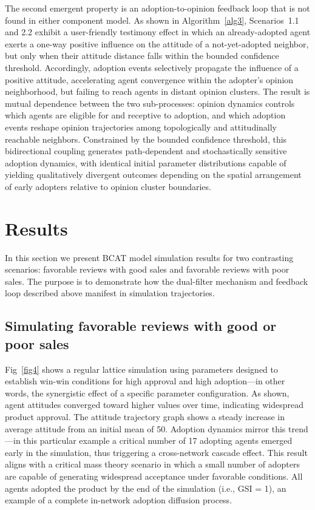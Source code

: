 \documentclass[10pt,letterpaper]{article}
\begin{document}
The second emergent property is an adoption-to-opinion feedback loop that is not found in either component model. As shown in Algorithm~\ref{alg3}, Scenarios~1.1 and 2.2 exhibit a user-friendly testimony effect in which an already-adopted agent exerts a one-way positive influence on the attitude of a not-yet-adopted neighbor, but only when their attitude distance falls within the bounded confidence threshold. Accordingly, adoption events selectively propagate the influence of a positive attitude, accelerating agent convergence within the adopter's opinion neighborhood, but failing to reach agents in distant opinion clusters. The result is mutual dependence between the two sub-processes: opinion dynamics controls which agents are eligible for and receptive to adoption, and which adoption events reshape opinion trajectories among topologically and attitudinally reachable neighbors. Constrained by the bounded confidence threshold, this bidirectional coupling generates path-dependent and stochastically sensitive adoption dynamics, with identical initial parameter distributions capable of yielding qualitatively divergent outcomes depending on the spatial arrangement of early adopters relative to opinion cluster boundaries.


\section*{Results}

In this section we present BCAT model simulation results for two contrasting scenarios: favorable reviews with good sales and favorable reviews with poor sales. The purpose is to demonstrate how the dual-filter mechanism and feedback loop described above manifest in simulation trajectories.

\subsection*{Simulating favorable reviews with good or poor sales}

Fig~\ref{fig4} shows a regular lattice simulation using parameters designed to establish win-win conditions for high approval and high adoption---in other words, the synergistic effect of a specific parameter configuration. As shown, agent attitudes converged toward higher values over time, indicating widespread product approval. The attitude trajectory graph shows a steady increase in average attitude from an initial mean of 50. Adoption dynamics mirror this trend---in this particular example a critical number of 17 adopting agents emerged early in the simulation, thus triggering a cross-network cascade effect. This result aligns with a critical mass theory scenario in which a small number of adopters are capable of generating widespread acceptance under favorable conditions. All agents adopted the product by the end of the simulation (i.e., GSI = 1), an example of a complete in-network adoption diffusion process.
\end{document}
